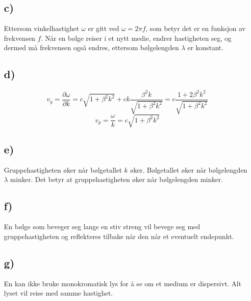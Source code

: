 \documentclass{article}
\begin{document}
  \subsection*{c)}
    Ettersom vinkelhastighet $ω$ er gitt ved $ω = 2πf$, som betyr det er en funksjon av frekvensen $f$. Når en bølge reiser i et nytt medie, endrer hastigheten seg, og dermed må frekvensen også endres, ettersom bølgelengden $λ$ er konstant.
    
  \subsection*{d)}
    \[
    v_g = \frac{∂ ω}{∂ k} = c\sqrt{1 + β^2 k^2} + ck \frac{β^2k}{\sqrt{1 + β^2 k^2}} = c\frac{1 + 2β^2k^2}{\sqrt{1 + β^2k^2}}
    \]
    \[
    v_p = \frac{ω}{k} = c\sqrt{1 + β^2k^2}
    \]
    
  \subsection*{e)}
    Gruppehastigheten øker når bølgetallet $k$ øker. Bølgetallet øker når bølgelengden $λ$ minker. Det betyr at gruppehastigheten øker når bølgelengden minker.
    
  \subsection*{f)}
    En bølge som beveger seg langs en stiv streng vil bevege seg med gruppehastigheten og reflekteres tilbake når den når et eventuelt endepunkt. 
    
  \subsection*{g)}
    En kan ikke bruke monokromatisk lys for å se om et medium er dispersivt. Alt lyset vil reise med samme hastighet. 

    
    
       
\end{document}
